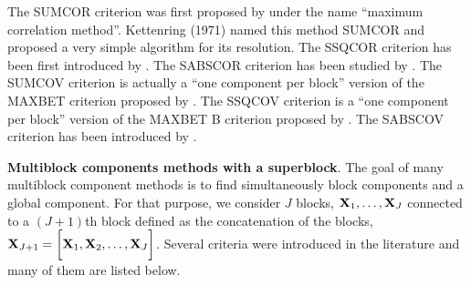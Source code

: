 \documentclass[
]{jss}
\begin{document}
The SUMCOR criterion was first proposed by
\citep{Horst1961, Horst1961b, 
Horst1965} under the name ``maximum correlation method''. Kettenring
(1971) named this method SUMCOR and proposed a very simple algorithm for
its resolution. The SSQCOR criterion has been first introduced by
\citep{Kettenring1971}. The SABSCOR criterion has been studied by
\citep{Hanafi2007}. The SUMCOV criterion is actually a ``one component
per block'' version of the MAXBET criterion proposed by
\citep{VandeGeer1984}. The SSQCOV criterion is a ``one component per
block'' version of the MAXBET B criterion proposed by
\citep{Hanafi2006}. The SABSCOV criterion has been introduced by
\citep{Kramer2007}.

\textbf{Multiblock components methods with a superblock}. The goal of
many multiblock component methods is to find simultaneously block
components and a global component. For that purpose, we consider \(J\)
blocks, \(\mathbf{X}_1, \ldots, \mathbf{X}_J\) connected to a \((J + 1)\)th block
defined as the concatenation of the blocks,
\(\mathbf{X}_{J+1} = \bigg[\mathbf{X}_1 , \mathbf{X}_2, \ldots, \mathbf{X}_J \bigg]\).
Several criteria were introduced in the literature and many of them are
listed below.
\end{document}
